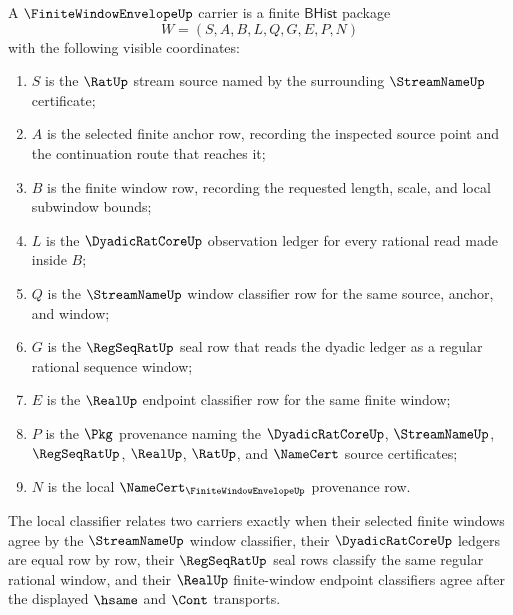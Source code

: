\begin{definition}
\label{def:finite-window-envelope-carrier}
A $\FiniteWindowEnvelopeUp$ carrier is a finite $\mathsf{BHist}$ package
$$
W=(S,A,B,L,Q,G,E,P,N)
$$
with the following visible coordinates:
\begin{enumerate}
\item $S$ is the $\RatUp$ stream source named by the surrounding $\StreamNameUp$ certificate;
\item $A$ is the selected finite anchor row, recording the inspected source point and the continuation route that reaches it;
\item $B$ is the finite window row, recording the requested length, scale, and local subwindow bounds;
\item $L$ is the $\DyadicRatCoreUp$ observation ledger for every rational read made inside $B$;
\item $Q$ is the $\StreamNameUp$ window classifier row for the same source, anchor, and window;
\item $G$ is the $\RegSeqRatUp$ seal row that reads the dyadic ledger as a regular rational sequence window;
\item $E$ is the $\RealUp$ endpoint classifier row for the same finite window;
\item $P$ is the $\Pkg$ provenance naming the $\DyadicRatCoreUp$, $\StreamNameUp$, $\RegSeqRatUp$, $\RealUp$, $\RatUp$, and $\NameCert$ source certificates;
\item $N$ is the local $\NameCert_{\FiniteWindowEnvelopeUp}$ provenance row.
\end{enumerate}
The local classifier relates two carriers exactly when their selected finite windows agree by the $\StreamNameUp$ window classifier, their $\DyadicRatCoreUp$ ledgers are equal row by row, their $\RegSeqRatUp$ seal rows classify the same regular rational window, and their $\RealUp$ finite-window endpoint classifiers agree after the displayed $\hsame$ and $\Cont$ transports.
\end{definition}

